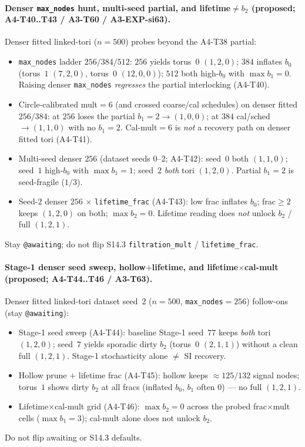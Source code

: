 \documentclass[11pt]{article}
\begin{document}
\paragraph{Denser \texttt{max\_nodes} hunt, multi-seed partial, and
lifetime$\neq b_2$ (proposed; A4-T40..T43 / A3-T60 / A3-EXP-si63).}
Denser fitted linked-tori ($n{=}500$) probes beyond the A4-T38 partial:
\begin{itemize}[leftmargin=1.5em]
  \item \texttt{max\_nodes} ladder $256/384/512$: $256$ yields torus~$0$
  $(1,2,0)$; $384$ inflates $b_0$ (torus~$1$ $(7,2,0)$, torus~$0$
  $(12,0,0)$); $512$ both high-$b_0$ with $\max b_1{=}0$. Raising
  denser \texttt{max\_nodes} \emph{regresses} the partial interlocking
  (A4-T40).
  \item Circle-calibrated mult${=}6$ (and crossed coarse/cal schedules) on
  denser fitted $256/384$: at $256$ loses the partial $b_1{=}2\to(1,0,0)$;
  at $384$ cal/sched $\to(1,1,0)$ with no $b_1{=}2$. Cal-mult${=}6$ is
  \emph{not} a recovery path on denser fitted tori (A4-T41).
  \item Multi-seed denser $256$ (dataset seeds $0$--$2$; A4-T42): seed~$0$
  both $(1,1,0)$; seed~$1$ high-$b_0$ with $\max b_1{=}1$; seed~$2$
  \emph{both} tori $(1,2,0)$. Partial $b_1{=}2$ is seed-fragile ($1/3$).
  \item Seed-$2$ denser $256$ $\times$ \texttt{lifetime\_frac} (A4-T43):
  low frac inflates $b_0$; frac$\ge 2$ keeps $(1,2,0)$ on both; $\max
  b_2{=}0$. Lifetime reading does \emph{not} unlock $b_2$ /
  full $(1,2,1)$.
\end{itemize}
Stay \texttt{@awaiting}; do not flip S14.3 \texttt{filtration\_mult} /
\texttt{lifetime\_frac}.

\paragraph{Stage-1 denser seed sweep, hollow$+$lifetime, and
lifetime$\times$cal-mult (proposed; A4-T44..T46 / A3-T63).}
Denser fitted linked-tori dataset seed~$2$ ($n{=}500$,
\texttt{max\_nodes}${=}256$) follow-ons (stay \texttt{@awaiting}):
\begin{itemize}[leftmargin=1.5em]
  \item Stage-1 seed sweep (A4-T44): baseline Stage-1 seed~$77$ keeps
  \emph{both} tori $(1,2,0)$; seed~$7$ yields sporadic dirty $b_2$
  (torus~$0$ $(2,1,1)$) without a clean full $(1,2,1)$. Stage-1
  stochasticity alone $\neq$ SI recovery.
  \item Hollow prune $+$ lifetime frac (A4-T45): hollow keeps
  $\approx 125/132$ signal nodes; torus~$1$ shows dirty $b_2$ at all
  fracs (inflated $b_0$, $b_1$ often $0$) --- no full $(1,2,1)$.
  \item Lifetime$\times$cal-mult grid (A4-T46): $\max b_2{=}0$ across the
  probed frac$\times$mult cells ($\max b_1{=}3$); cal-mult alone does not
  unlock $b_2$.
\end{itemize}
Do not flip awaiting or S14.3 defaults.
\end{document}

